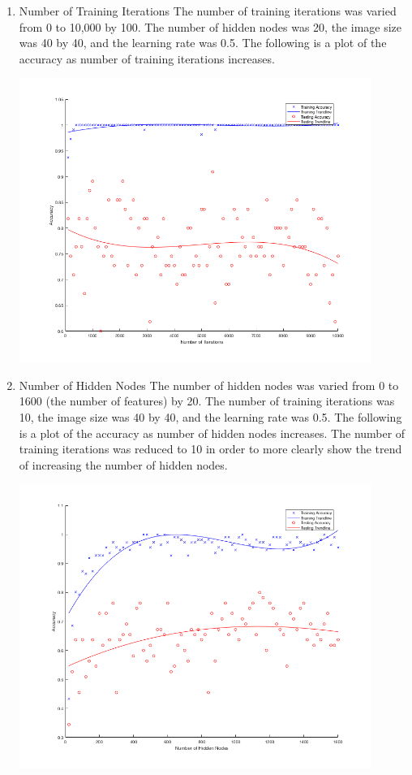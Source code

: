 \documentclass[12pt]{article}
\begin{document}
\begin{enumerate}
  \item Number of Training Iterations
  The number of training iterations was varied from 0 to 10,000 by 100. The number of hidden nodes was 20, the image size was 40 by 40, and the learning rate was 0.5. The following is a plot of the accuracy as number of training iterations increases.
  \begin{center}
    \includegraphics[width=115mm]{./accuracy_imgs/num_iterations_empirical.png}
    \label{fig:num_iterations}
  \end{center}
  \item Number of Hidden Nodes
  The number of hidden nodes was varied from 0 to 1600 (the number of features) by 20. The number of training iterations was 10, the image size was 40 by 40, and the learning rate was 0.5. The following is a plot of the accuracy as number of hidden nodes increases. The number of training iterations was reduced to 10 in order to more clearly show the trend of increasing the number of hidden nodes.
  \begin{center}
    \includegraphics[width=115mm]{./accuracy_imgs/hidden_node_empirical_10_iters.png}

\end{center}
\end{enumerate}
\end{document}
